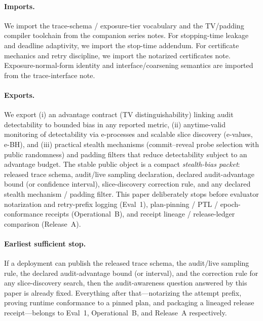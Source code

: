 \documentclass[11pt]{article}
\begin{document}
\paragraph{Imports.}
We import the trace-schema / exposure-tier vocabulary and the TV/padding compiler toolchain from the companion series notes.\cite{series:schedcompiler,series:knapsacktransport}
For stopping-time leakage and deadline adaptivity, we import the stop-time addendum.\cite{series:stoptimeaddendum}
For certificate mechanics and retry discipline, we import the notarized certificates note.\cite{series:evalnotary}
Exposure-normal-form identity and interface/coarsening semantics are imported from the trace-interface note.\cite{series:traceifaces}

\paragraph{Exports.}
We export (i) an advantage contract (TV distinguishability) linking audit detectability to bounded bias in any reported metric, (ii) anytime-valid monitoring of detectability via e-processes and scalable slice discovery (e-values, e-BH), and (iii) practical stealth mechanisms (commit--reveal probe selection with public randomness) and padding filters that reduce detectability subject to an advantage budget.
The stable public object is a compact \emph{stealth-bias packet}: released trace schema, audit/live sampling declaration, declared audit-advantage bound (or confidence interval), slice-discovery correction rule, and any declared stealth mechanism / padding filter.
This paper deliberately stops before evaluator notarization and retry-prefix logging (Eval~1), plan-pinning / PTL / epoch-conformance receipts (Operational~B), and receipt lineage / release-ledger comparison (Release~A).

\paragraph{Earliest sufficient stop.}
If a deployment can publish the released trace schema, the audit/live sampling rule, the declared audit-advantage bound (or interval), and the correction rule for any slice-discovery search, then the audit-awareness question answered by this paper is already fixed.
Everything after that---notarizing the attempt prefix, proving runtime conformance to a pinned plan, and packaging a lineaged release receipt---belongs to Eval~1, Operational~B, and Release~A respectively.
\end{document}
